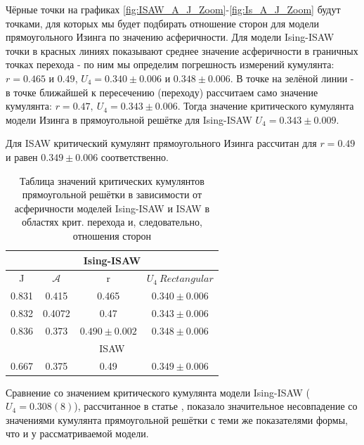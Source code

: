 \newpage

Чёрные точки на графиках \ref{fig:ISAW_A_J_Zoom}-\ref{fig:Is_A_J_Zoom} будут точками, для которых мы будет подбирать отношение сторон для модели прямоугольного Изинга по значению асферичности. Для модели Ising-ISAW точки в красных линиях показывают среднее значение асферичности в граничных точках перехода - по ним мы определим погрешность измерений кумулянта: $r = 0.465$ и $0.49$, $U_{4} = 0.340\pm0.006$ и $0.348\pm0.006$. В точке на зелёной линии - в точке ближайшей к пересечению (переходу) рассчитаем само значение кумулянта: $r = 0.47,\ U_{4} = 0.343\pm0.006$. Тогда значение критического кумулянта модели Изинга в прямоугольной решётке для Ising-ISAW $U_{4} = 0.343\pm0.009$.

Для ISAW критический кумулянт прямоугольного Изинга рассчитан для $r=0.49$ и равен $0.349 \pm 0.006$ соответственно.

\begin{table}[h!]
    \centering
    \begin{tabular}{|c|c|c|c|}
        \hline
         \multicolumn{4}{|c|}{Ising-ISAW}  \\ \hline
         J & $\mathcal{A}$ & r & $U_{4}\  Rectangular$ \\ \hline
         0.831 & 0.415 & 0.465 & $0.340 \pm 0.006$\\ \hline
         0.832 & 0.4072 & 0.47 & $0.343 \pm 0.006$\\ \hline
         0.836 & 0.373 & $0.490 \pm 0.002$ & $0.348 \pm 0.006$\\ \hline
         \multicolumn{4}{|c|}{ISAW} \\ \hline
         0.667 & 0.375 & 0.49 & $0.349 \pm 0.006$ \\ \hline
    \end{tabular}
    \caption{Таблица значений критических кумулянтов прямоугольной решётки в зависимости от асферичности моделей Ising-ISAW и ISAW в областях крит. перехода и, следовательно, отношения сторон}
    \label{tab:my_label}
\end{table}

Сравнение со значением критического кумулянта модели Ising-ISAW ($U_{4} = 0.308(8)$\cite{faizullina2021critical}), рассчитанное в статье \cite{faizullina2021critical}, показало значительное несовпадение со значениями кумулянта прямоугольной решётки с теми же показателями формы, что и у рассматриваемой модели. 